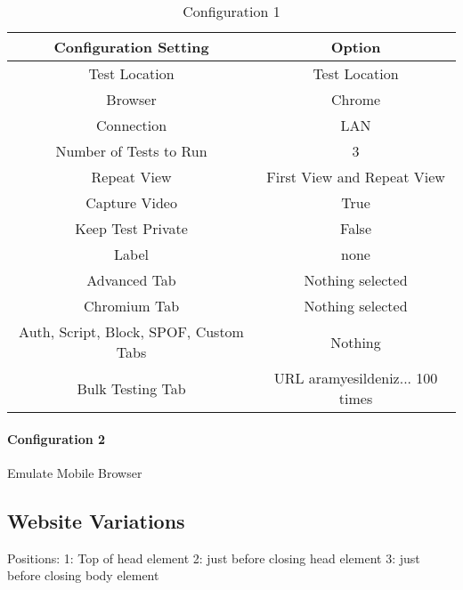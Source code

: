 \begin{table}[h]
	\caption[Test Runs]{Configuration 1}
	\label{tab:tamodelleVergleich}
	\centering
	\begin{tabular}{ |c|c| } 
	\hline
	Configuration Setting & Option \\
	\hline
	Test Location & Test Location \\ 
	Browser & Chrome \\
	\hline
	Connection & LAN \\
	Number of Tests to Run & 3 \\
	Repeat View & First View and Repeat View \\
	Capture Video & True \\
	Keep Test Private & False \\
	Label & none \\
	\hline	  
	Advanced Tab & Nothing selected \\
	Chromium Tab & Nothing selected  \\
	Auth, Script, Block, SPOF, Custom Tabs & Nothing  \\
	Bulk Testing Tab & URL aramyesildeniz... 100 times \\
	\hline
	\end{tabular}
\end{table}

\paragraph{Configuration 2}

Emulate Mobile Browser

\subsection{Website Variations}

Positions:
1: Top of head element
2: just before closing head element
3: just before closing body element

